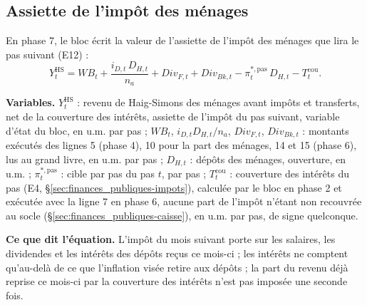 \documentclass[11pt,a4paper]{article}
\newcommand{\variables}{\par\noindent\textbf{Variables.} }
\newcommand{\sens}{\par\noindent\textbf{Ce que dit l'équation.} }
\begin{document}
\subsection{Assiette de l'impôt des ménages}
\label{sec:finances_publiques-assiette}
\begin{proposee}
En phase 7, le bloc écrit la valeur de l'assiette de l'impôt des ménages que lira le pas suivant (E12) :
\begin{equation*}
Y^{\mathrm{HS}}_t = \mathit{WB}_t + \frac{i_{D,t}\,D_{H,t}}{n_a} + \mathit{Div}_{F,t} + \mathit{Div}_{\mathit{Bk},t} - \pi^{\ast,\mathrm{pas}}_t\,D_{H,t} - T^{\mathrm{cou}}_t . \tag{E12}
\end{equation*}

\variables $Y^{\mathrm{HS}}_t$ : revenu de Haig-Simons des ménages avant impôts et transferts, net de la couverture des intérêts, assiette de l'impôt du pas suivant, variable d'état du bloc, en u.m. par pas ; $\mathit{WB}_t$, $i_{D,t}D_{H,t}/n_a$, $\mathit{Div}_{F,t}$, $\mathit{Div}_{\mathit{Bk},t}$ : montants exécutés des lignes 5 (phase 4), 10 pour la part des ménages, 14 et 15 (phase 6), lus au grand livre, en u.m. par pas ; $D_{H,t}$ : dépôts des ménages, ouverture, en u.m. ; $\pi^{\ast,\mathrm{pas}}_t$ : cible par pas du pas $t$, par pas ; $T^{\mathrm{cou}}_t$ : couverture des intérêts du pas (E4, \S\ref{sec:finances_publiques-impots}), calculée par le bloc en phase 2 et exécutée avec la ligne 7 en phase 6, aucune part de l'impôt n'étant non recouvrée au socle (\S\ref{sec:finances_publiques-caisse}), en u.m. par pas, de signe quelconque.
\sens L'impôt du mois suivant porte sur les salaires, les dividendes et les intérêts des dépôts reçus ce mois-ci ; les intérêts ne comptent qu'au-delà de ce que l'inflation visée retire aux dépôts ; la part du revenu déjà reprise ce mois-ci par la couverture des intérêts n'est pas imposée une seconde fois.

\end{proposee}
\end{document}
